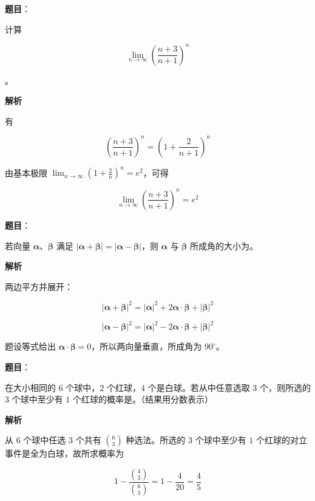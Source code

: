 \begin{answer}

\textbf{题目}：

计算

\nopagebreak[4]
\[
\lim_{n\to\infty}\left(\dfrac{n+3}{n+1}\right)^n
\]

。

\textbf{解析}

有

\nopagebreak[4]
\[
\left(\frac{n+3}{n+1}\right)^n
=\left(1+\frac2{n+1}\right)^n
\]

由基本极限 $\displaystyle\lim_{n\to\infty}\left(1+\frac2n\right)^n=e^2$，可得

\nopagebreak[4]
\[
\lim_{n\to\infty}\left(\frac{n+3}{n+1}\right)^n=e^2
\]


\end{answer}
\begin{answer}

\textbf{题目}：

若向量 $\boldsymbol{\alpha}$、$\boldsymbol{\beta}$ 满足 $\lvert\boldsymbol{\alpha}+\boldsymbol{\beta}\rvert=\lvert\boldsymbol{\alpha}-\boldsymbol{\beta}\rvert$，则 $\boldsymbol{\alpha}$ 与 $\boldsymbol{\beta}$ 所成角的大小为\gkblank{}。

\textbf{解析}

两边平方并展开：

\nopagebreak[4]
\[
\lvert\boldsymbol{\alpha}+\boldsymbol{\beta}\rvert^2
=\lvert\boldsymbol{\alpha}\rvert^2
+2\boldsymbol{\alpha}\cdot\boldsymbol{\beta}
+\lvert\boldsymbol{\beta}\rvert^2
\]

\nopagebreak[4]
\[
\lvert\boldsymbol{\alpha}-\boldsymbol{\beta}\rvert^2
=\lvert\boldsymbol{\alpha}\rvert^2
-2\boldsymbol{\alpha}\cdot\boldsymbol{\beta}
+\lvert\boldsymbol{\beta}\rvert^2
\]

题设等式给出 $\boldsymbol{\alpha}\cdot\boldsymbol{\beta}=0$，所以两向量垂直，所成角为 $90^\circ$。


\end{answer}
\begin{answer}

\textbf{题目}：

在大小相同的 $6$ 个球中，$2$ 个红球，$4$ 个是白球。若从中任意选取 $3$ 个，则所选的 $3$ 个球中至少有 $1$ 个红球的概率是\gkblank{}。（结果用分数表示）

\textbf{解析}

从 $6$ 个球中任选 $3$ 个共有 $\binom63$ 种选法。所选的 $3$ 个球中至少有 $1$ 个红球的对立事件是全为白球，故所求概率为

\nopagebreak[4]
\[
1-\frac{\binom43}{\binom63}
=1-\frac4{20}
=\frac45
\]


\end{answer}
